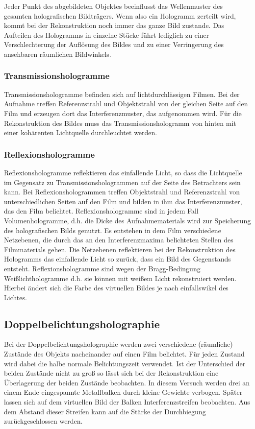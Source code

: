 \documentclass[12pt]{article}
\begin{document}
Jeder Punkt des abgebildeten Objektes beeinflusst das Wellenmuster des gesamten holografischen Bildträgers. Wenn also ein Hologramm zerteilt wird, kommt bei
der Rekonstruktion noch immer das ganze Bild zustande. Das Aufteilen des Hologramms in einzelne Stücke führt lediglich zu einer Verschlechterung der
Auflösung des Bildes und zu einer Verringerung des ansehbaren räumlichen Bildwinkels.

\subsubsection{Transmissionshologramme}
Transmissionshologramme befinden sich auf lichtdurchlässigen Filmen. Bei der Aufnahme treffen Referenzstrahl und Objektstrahl von der gleichen Seite auf
den Film und erzeugen dort das Interferenzmuster, das aufgenommen wird.
Für die Rekonstruktion des Bildes muss das Transmissionshologramm von hinten mit einer kohärenten Lichtquelle durchleuchtet werden.

\subsubsection{Reflexionshologramme}
Reflexionshologramme reflektieren das einfallende Licht, so dass die Lichtquelle im Gegensatz zu Transmissionshologrammen auf der Seite des Betrachters sein
kann. Bei Reflexionshologrammen treffen Objektstrahl und Referenzstrahl von unterschiedlichen Seiten auf den Film und bilden in ihm das Interferenzmuster, das 
den Film belichtet. Reflexionshologramme sind in jedem Fall Volumenhologramme, d.h. die Dicke des Aufnahmematerials wird zur Speicherung des holografischen 
Bilds genutzt. Es entstehen in dem Film verschiedene Netzebenen, die durch das an den Interferenzmaxima belichteten Stellen des Filmmaterials gehen. Die 
Netzebenen reflektieren bei der Rekonstruktion des Hologramms das einfallende Licht so zurück, dass ein Bild des Gegenstands entsteht. Reflexionshologramme 
sind wegen der Bragg-Bedingung Weißlichthologramme d.h. sie können mit weißem Licht rekonstruiert werden. Hierbei ändert sich die Farbe des virtuellen Bildes
je nach einfallswikel des Lichtes.

\subsection{Doppelbelichtungsholographie}
Bei der Doppelbelichtungsholographie werden zwei verschiedene (räumliche) Zustände des Objekts nacheinander auf einen Film belichtet. Für jeden Zustand wird
dabei die halbe normale Belichtungszeit verwendet. Ist der Unterschied der beiden Zustände nicht zu groß so lässt sich bei der Rekonstruktion eine Überlagerung der
beiden Zustände beobachten. In diesem Versuch werden drei an einem Ende eingespannte Metallbalken durch kleine Gewichte verbogen. Später lassen sich auf dem
virtuellen Bild der Balken Interferenzstreifen beobachten. Aus dem Abstand dieser Streifen kann auf die Stärke der Durchbiegung zurückgeschlossen werden.
\end{document}
